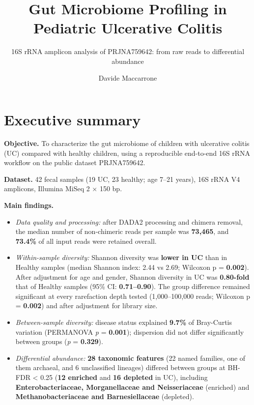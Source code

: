 \documentclass[
  letterpaper,
  DIV=11,
  numbers=noendperiod]{scrartcl}
\title{Gut Microbiome Profiling in Pediatric Ulcerative Colitis}
\subtitle{16S rRNA amplicon analysis of PRJNA759642: from raw reads to
differential abundance}
\author{Davide Maccarrone}
\date{}
\providecommand{\tightlist}{%
  \setlength{\itemsep}{0pt}\setlength{\parskip}{0pt}}
\begin{document}
\maketitle


\section{Executive summary}\label{executive-summary}

\textbf{Objective.} To characterize the gut microbiome of children with
ulcerative colitis (UC) compared with healthy children, using a
reproducible end-to-end 16S rRNA workflow on the public dataset
PRJNA759642.

\textbf{Dataset.} 42 fecal samples (19 UC, 23 healthy; age 7--21 years),
16S rRNA V4 amplicons, Illumina MiSeq 2 × 150 bp.

\textbf{Main findings.}

\begin{itemize}
\tightlist
\item
  \emph{Data quality and processing:} after DADA2 processing and chimera
  removal, the median number of non-chimeric reads per sample was
  \textbf{73,465}, and \textbf{73.4\%} of all input reads were retained
  overall.
\item
  \emph{Within-sample diversity:} Shannon diversity was \textbf{lower in
  UC} than in Healthy samples (median Shannon index: 2.44 vs 2.69;
  Wilcoxon p = \textbf{0.002}). After adjustment for age and gender,
  Shannon diversity in UC was \textbf{0.80-fold} that of Healthy samples
  (95\% CI: \textbf{0.71--0.90}). The group difference remained
  significant at every rarefaction depth tested (1,000--100,000 reads;
  Wilcoxon p = \textbf{0.002}) and after adjustment for library size.
\item
  \emph{Between-sample diversity:} disease status explained
  \textbf{9.7\%} of Bray-Curtis variation (PERMANOVA \emph{p} =
  \textbf{0.001}); dispersion did not differ significantly between
  groups (\emph{p} = \textbf{0.329}).
\item
  \emph{Differential abundance:} \textbf{28 taxonomic features} (22
  named families, one of them archaeal, and 6 unclassified lineages)
  differed between groups at BH-FDR \textless{} 0.25 (\textbf{12
  enriched} and \textbf{16 depleted} in UC), including
  \textbf{Enterobacteriaceae, Morganellaceae and Neisseriaceae}
  (enriched) and \textbf{Methanobacteriaceae and Barnesiellaceae}
  (depleted).
\end{itemize}
\end{document}
